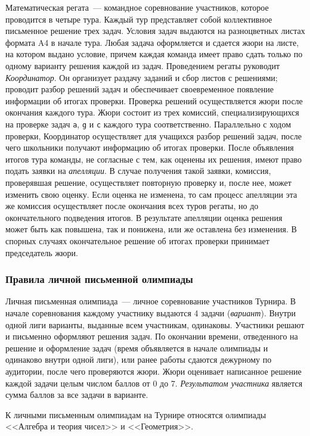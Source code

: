 Математическая регата~---
командное соревнование участников, которое проводится в четыре тура.
Каждый тур представляет собой коллективное письменное решение трех задач.
Условия задач выдаются на разноцветных листах формата A4 в начале тура.
Любая задача оформляется и сдается жюри на листе, на котором выдано условие,
причем каждая команда имеет право сдать только по одному варианту решения
каждой из задач.
Проведением регаты руководит \emph{Координатор}.
Он организует раздачу заданий и сбор листов с решениями; проводит разбор
решений задач и обеспечивает своевременное появление информации об итогах
проверки.
Проверка решений осуществляется жюри после окончания каждого тура.
Жюри состоит из трех комиссий, специализирующихся на проверке задач
\texttt{a}, \texttt{g} и \texttt{c} каждого тура соответственно.
Параллельно с ходом проверки, Координатор осуществляет для учащихся разбор
решений задач, после чего школьники получают информацию об итогах проверки.
После объявления итогов тура команды, не согласные с тем, как оценены их
решения, имеют право подать заявки на \emph{апелляции}.
В случае получения такой заявки, комиссия, проверявшая решение, осуществляет
повторную проверку и, после нее, может изменить свою оценку.
Если оценка не изменена, то сам процесс апелляции эта же комиссия осуществляет
после окончания всех туров регаты, но до окончательного подведения итогов.
В результате апелляции оценка решения может быть как повышена, так и понижена,
или же оставлена без изменения.
В спорных случаях окончательное решение об итогах проверки принимает
председатель жюри.

\subsubsection*{Правила личной письменной олимпиады}

Личная письменная олимпиада~---
личное соревнование участников Турнира.
В начале соревнования каждому участнику выдаются 4 задачи (\emph{вариант}).
Внутри одной лиги варианты, выданные всем участникам, одинаковы.
Участники решают и письменно оформляют решения задач.
По окончании времени, отведенного на решение и оформление задач (время
объявляется в начале олимпиады и одинаково внутри одной лиги), или ранее
работы сдаются дежурному по аудитории, после чего проверяются жюри.
Жюри оценивает написанное решение каждой задачи целым числом баллов от 0 до 7.
\emph{Результатом участника}
является сумма баллов за все задачи в варианте.

К личными письменным олимпиадам на Турнире относятся олимпиады
<<Алгебра и теория чисел>> и <<Геометрия>>.

